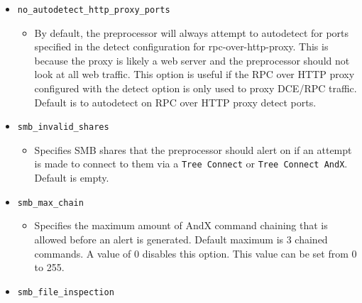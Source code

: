\documentclass[english]{report}
\begin{document}
\begin{itemize}
\begin{itemize}
\end{itemize}

\item[] \texttt{no\_autodetect\_http\_proxy\_ports}

\begin{itemize}

\item[] By default, the preprocessor will always attempt to autodetect for
ports specified in the detect configuration for rpc-over-http-proxy.  This is
because the proxy is likely a web server and the preprocessor should not look
at all web traffic. This option is useful if the RPC over HTTP proxy configured
with the detect option is only used to proxy DCE/RPC traffic.  Default is to
autodetect on RPC over HTTP proxy detect ports.

\end{itemize}

\item[] \texttt{smb\_invalid\_shares}

\begin{itemize}

\item[] Specifies SMB shares that the preprocessor should alert on if an
attempt is made to connect to them via a \texttt{Tree Connect} or \texttt{Tree
Connect AndX}.  Default is empty.

\end{itemize}

\item[] \texttt{smb\_max\_chain}

\begin{itemize}

\item[] Specifies the maximum amount of AndX command chaining that is allowed
before an alert is generated.  Default maximum is 3 chained commands.  A value
of 0 disables this option. This value can be set from 0 to 255.

\end{itemize}

\item[] \texttt{smb\_file\_inspection}

\begin{itemize}


\end{itemize}
\end{itemize}
\end{document}
